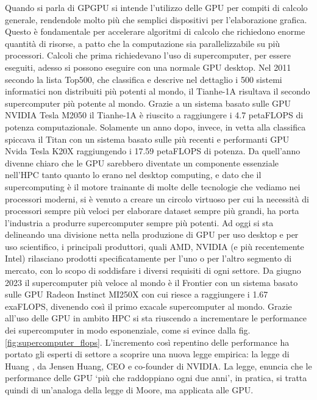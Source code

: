 Quando si parla di \gls{GPGPU} si intende l'utilizzo delle GPU per compiti di calcolo generale, rendendole molto più che semplici dispositivi per l'elaborazione grafica. Questo è fondamentale per accelerare algoritmi di calcolo che richiedono enorme quantità di risorse, a patto che la computazione sia parallelizzabile su più processori.
Calcoli che prima richiedevano l'uso di supercomputer, per essere eseguiti, adesso si possono eseguire con una normale GPU desktop. 
Nel 2011 secondo la lista Top500, che classifica e descrive nel dettaglio i 500 sistemi informatici non distribuiti più potenti al mondo, il Tianhe-1A risultava il secondo supercomputer più potente al mondo. Grazie a un sistema basato sulle GPU NVIDIA Tesla M2050 \cite[]{Tianhe-1A:link} il Tianhe-1A è riuscito a raggiungere i 4.7 petaFLOPS di potenza computazionale. Solamente un anno dopo, invece, in vetta alla classifica spiccava il Titan \cite[]{Titan:link} con un sistema basato sulle più recenti e performanti GPU Nvida Tesla K20X raggiungendo i 17.59 petaFLOPS di potenza.
Da quell'anno divenne chiaro che le GPU sarebbero diventate un componente essenziale nell'HPC tanto quanto lo erano nel desktop computing, e dato che il supercomputing è il motore trainante di molte delle tecnologie che vediamo nei processori moderni, si è venuto a creare un circolo virtuoso per cui la necessità di processori sempre più veloci per elaborare dataset sempre più grandi, ha porta l'industria a produrre supercomputer sempre più potenti. Ad oggi si sta delineando una divisione netta nella produzione di GPU per uso desktop e per uso scientifico, i principali produttori, quali AMD, NVIDIA (e più recentemente Intel) rilasciano prodotti specificatamente per l'uno o per l'altro segmento di mercato, con lo scopo di soddisfare i diversi requisiti di ogni settore. Da giugno 2023 il supercomputer più veloce al mondo è il Frontier \cite[]{Frontier:link} con un sistema basato sulle GPU Radeon Instinct MI250X con cui riesce a raggiungere i 1.67 exaFLOPS, divenendo così il primo exacale supercomputer al mondo. Grazie all'uso delle GPU in ambito HPC si sta riuscendo a incrementare le performance dei supercomputer in modo esponenziale, come si evince dalla fig. \ref{fig:supercomputer_flops}. L'incremento così repentino delle performance ha portato gli esperti di settore a scoprire una nuova legge empirica: la legge di Huang \cite[]{Huang:law}, da Jensen Huang, CEO e co-founder di NVIDIA. La legge, enuncia che le performance delle GPU `più che raddoppiano ogni due anni', in pratica, si tratta quindi di un'analoga della legge di Moore, ma applicata alle GPU.

